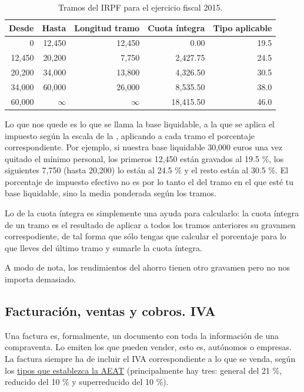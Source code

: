 \documentclass[nochap,palatino,notitlepage]{apuntes}
\begin{document}
\begin{table}[hbtp]
\centering
\footnotesize
\begin{tabular}{r|r|r|r|r}
\textbf{Desde} & \textbf{Hasta} & \textbf{Longitud tramo} & \textbf{Cuota íntegra} & \textbf{Tipo aplicable} \\ \toprule
0 & 12,450 & 12,450 & 0.00 & 19.5 \\
12,450 & 20,200 & 7,750 & 2,427.75 & 24.5 \\
20,200 & 34,000 & 13,800 & 4,326.50 & 30.5 \\
34,000 & 60,000 & 26,000 & 8,535.50 & 38.0 \\
60,000 & $\infty$ & $\infty$ & 18,415.50 & 46.0 \\
\end{tabular}
\caption{Tramos del IRPF para el ejercicio fiscal 2015.}
\label{tab:Tramos2015IRPF}
\end{table}

Lo que nos quede es lo que se llama la base liquidable, a la que se aplica el impuesto según la escala de la , aplicando a cada tramo el porcentaje correspondiente. Por ejemplo, si nuestra base liquidable 30,000 euros una vez quitado el mínimo personal, los primeros 12,450 están gravados al 19.5 \%, los siguientes 7,750 (hasta 20,200) lo están al 24.5 \% y el resto están al 30.5 \%. El porcentaje de impuesto efectivo no es por lo tanto el del tramo en el que esté tu base liquidable, sino la media ponderada según los tramos.

Lo de la cuota íntegra es simplemente una ayuda para calcularlo: la cuota íntegra de un tramo es el resultado de aplicar a todos los tramos anteriores su gravamen correspodiente, de tal forma que sólo tengas que calcular el porcentaje para lo que lleves del último tramo y sumarle la cuota íntegra.

A modo de nota, los rendimientos del ahorro tienen otro gravamen pero no nos importa demasiado.

\subsection{Facturación, ventas y cobros. IVA}

Una factura es, formalmente, un documento con toda la información de una compraventa. Lo emiten los que pueden vender, esto es, autónomos o empresas. La factura siempre ha de incluir el IVA correspondiente a lo que se venda, según los \href{http://www.agenciatributaria.es/static_files/AEAT/Contenidos_Comunes/La_Agencia_Tributaria/Segmentos_Usuarios/Empresas_y_profesionales/Novedades_IVA_2014/Nuevos_tipos_IVA.pdf}{tipos que establezca la AEAT} (principalmente hay tres: general del 21 \%, reducido del 10 \% y superreducido del 10 \%).
\end{document}
